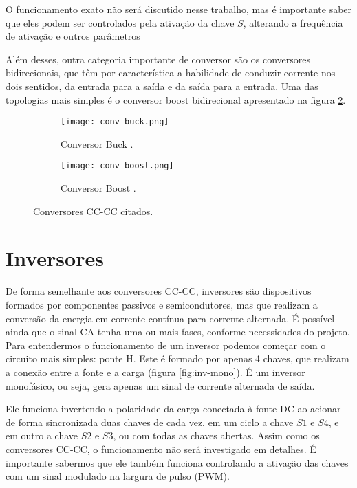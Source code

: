    O funcionamento exato não será discutido nesse trabalho, mas é importante saber que eles podem ser controlados pela ativação da chave $S$, alterando a frequência de ativação e outros parâmetros

   Além desses, outra categoria importante de conversor são os conversores bidirecionais, que têm por característica a habilidade de conduzir corrente nos dois sentidos, da entrada para a saída e da saída para a entrada. Uma das topologias mais simples é o conversor boost bidirecional apresentado na figura \ref{fig:conv-boost}.

   \begin{figure}[!htb]
   \centering
      \begin{subfigure}{0.48\linewidth}
         \texttt{[image: conv-buck.png]}
         \caption{Conversor Buck \cite{Pet01}.}
         \label{fig:conv-buck}
      \end{subfigure}
      \hspace*{\fill}
      \begin{subfigure}{0.48\linewidth}
         \texttt{[image: conv-boost.png]}
         \caption{Conversor Boost \cite{Pom17}.}
         \label{fig:conv-boost}
      \end{subfigure}
   \caption{Conversores CC-CC citados.}
   \label{fig:conv-esquematicos}
   \end{figure}


\section{Inversores}

   De forma semelhante aos conversores CC-CC, inversores são dispositivos formados por componentes passivos e semicondutores, mas que realizam a conversão da energia em corrente contínua para corrente alternada. É possível ainda que o sinal CA tenha uma ou mais fases, conforme necessidades do projeto. Para entendermos o funcionamento de um inversor podemos começar com o circuito mais simples: ponte H. Este é formado por apenas 4 chaves, que realizam a conexão entre a fonte e a carga (figura \ref{fig:inv-mono}). É um inversor monofásico, ou seja, gera apenas um sinal de corrente alternada de saída.

   Ele funciona invertendo a polaridade da carga conectada à fonte DC ao acionar de forma sincronizada duas chaves de cada vez, em um ciclo a chave $S1$ e $S4$, e em outro a chave $S2$ e $S3$, ou com todas as chaves abertas. Assim como os conversores CC-CC, o funcionamento não será investigado em detalhes. É importante sabermos que ele também funciona controlando a ativação das chaves com um sinal modulado na largura de pulso (PWM).

